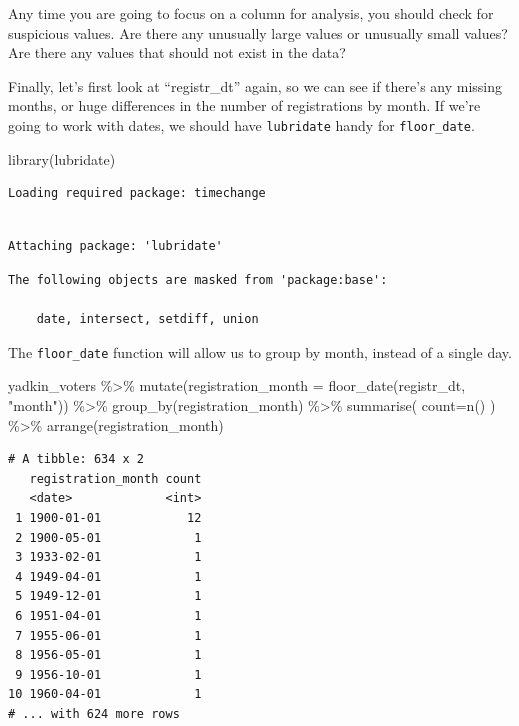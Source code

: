 \documentclass[
  letterpaper,
  DIV=11,
  numbers=noendperiod]{scrreprt}
\newenvironment{Shaded}{\begin{snugshade}}{\end{snugshade}}
\newcommand{\AttributeTok}[1]{\textcolor[rgb]{0.40,0.45,0.13}{#1}}
\newcommand{\FunctionTok}[1]{\textcolor[rgb]{0.28,0.35,0.67}{#1}}
\newcommand{\NormalTok}[1]{\textcolor[rgb]{0.00,0.23,0.31}{#1}}
\newcommand{\SpecialCharTok}[1]{\textcolor[rgb]{0.37,0.37,0.37}{#1}}
\newcommand{\StringTok}[1]{\textcolor[rgb]{0.13,0.47,0.30}{#1}}
\begin{document}
Any time you are going to focus on a column for analysis, you should
check for suspicious values. Are there any unusually large values or
unusually small values? Are there any values that should not exist in
the data?

Finally, let's first look at ``registr\_dt'' again, so we can see if
there's any missing months, or huge differences in the number of
registrations by month. If we're going to work with dates, we should
have \texttt{lubridate} handy for \texttt{floor\_date}.

\begin{Shaded}
\begin{Highlighting}[]
\FunctionTok{library}\NormalTok{(lubridate)}
\end{Highlighting}
\end{Shaded}

\begin{verbatim}
Loading required package: timechange
\end{verbatim}

\begin{verbatim}

Attaching package: 'lubridate'
\end{verbatim}

\begin{verbatim}
The following objects are masked from 'package:base':

    date, intersect, setdiff, union
\end{verbatim}

The \texttt{floor\_date} function will allow us to group by month,
instead of a single day.

\begin{Shaded}
\begin{Highlighting}[]
\NormalTok{yadkin\_voters }\SpecialCharTok{\%\textgreater{}\%}
  \FunctionTok{mutate}\NormalTok{(}\AttributeTok{registration\_month =} \FunctionTok{floor\_date}\NormalTok{(registr\_dt, }\StringTok{"month"}\NormalTok{)) }\SpecialCharTok{\%\textgreater{}\%}
  \FunctionTok{group\_by}\NormalTok{(registration\_month) }\SpecialCharTok{\%\textgreater{}\%}
   \FunctionTok{summarise}\NormalTok{(}
    \AttributeTok{count=}\FunctionTok{n}\NormalTok{()}
\NormalTok{  ) }\SpecialCharTok{\%\textgreater{}\%}
  \FunctionTok{arrange}\NormalTok{(registration\_month)}
\end{Highlighting}
\end{Shaded}

\begin{verbatim}
# A tibble: 634 x 2
   registration_month count
   <date>             <int>
 1 1900-01-01            12
 2 1900-05-01             1
 3 1933-02-01             1
 4 1949-04-01             1
 5 1949-12-01             1
 6 1951-04-01             1
 7 1955-06-01             1
 8 1956-05-01             1
 9 1956-10-01             1
10 1960-04-01             1
# ... with 624 more rows
\end{verbatim}
\end{document}
